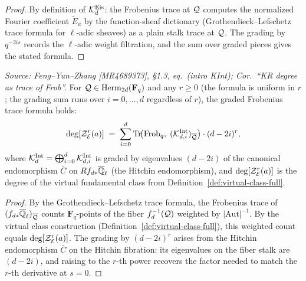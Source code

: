 \begin{proof}
  By definition of \(\mathcal{K}_d^{\mathrm{Eis}}\): the Frobenius trace at \(\mathcal{Q}\) computes
  the normalized Fourier coefficient \(\widetilde{E}_a\) by the function-sheaf
  dictionary (Grothendieck--Lefschetz trace formula for \(\ell\)-adic sheaves) as a
  plain stalk trace at \(\mathcal{Q}\). The grading by \(q^{-2is}\) records
  the \(\ell\)-adic weight filtration, and the sum over graded pieces gives the
  stated formula.
\end{proof}

\begin{theorem}
  \label{thm:trace-Int}
  \textit{Source: Feng--Yun--Zhang [MR4689373], \S1.3, eq.~(intro KInt); Cor.~``KR degree as trace of Frob''.}
  For \(\mathcal{Q} \in \operatorname{Herm}_{2d}(\mathbf{F}_q)\) and any \(r \geq 0\)
  (the formula is uniform in \(r\); the grading sum runs over \(i = 0, \ldots, d\)
  regardless of \(r\)), the graded Frobenius trace formula holds:
  \[
    \deg[\mathcal{Z}_{\mathcal{E}}^r(a)]
    \;=\;
    \sum_{i=0}^{d}
    \operatorname{Tr}\!\bigl(\operatorname{Frob}_q,\; (\mathcal{K}^{\mathrm{Int}}_{d,i})_{\overline{\mathcal{Q}}}\bigr)
    \cdot (d - 2i)^r,
  \]
  where \(\mathcal{K}^{\mathrm{Int}}_d = \bigoplus_{i=0}^d \mathcal{K}^{\mathrm{Int}}_{d,i}\) is graded
  by eigenvalues \((d-2i)\) of the canonical endomorphism \(\bar{C}\) on
  \(Rf_{d*}\overline{\mathbb{Q}}_\ell\) (the Hitchin endomorphism), and
  \(\deg[\mathcal{Z}_{\mathcal{E}}^r(a)]\) is the degree of the virtual fundamental class from
  Definition~\ref{def:virtual-class-full}.
\end{theorem}

\begin{proof}
  By the Grothendieck--Lefschetz trace formula, the Frobenius trace of
  \((f_{d*}\overline{\mathbb{Q}}_\ell)_{\overline{\mathcal{Q}}}\) counts \(\mathbf{F}_q\)-points of the fiber
  \(f_d^{-1}(\mathcal{Q})\) weighted by \(|\mathrm{Aut}|^{-1}\). By the virtual class
  construction (Definition~\ref{def:virtual-class-full}), this weighted count equals
  \(\deg[\mathcal{Z}_{\mathcal{E}}^r(a)]\). The grading by \((d-2i)^r\) arises from the Hitchin
  endomorphism \(\bar{C}\) on the Hitchin fibration: its eigenvalues on the fiber
  stalk are \((d-2i)\), and raising to the \(r\)-th power recovers the factor
  needed to match the \(r\)-th derivative at \(s = 0\).
\end{proof}
